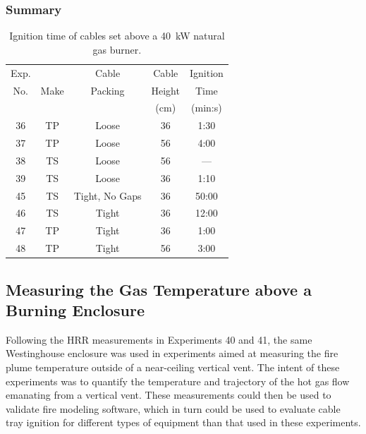 \clearpage

\subsubsection{Summary}

\begin{table}[ht]
\begin{center}
\caption[Summary of Cable Tray Ignition Experiments]{Ignition time of cables set above a 40~kW natural gas burner.}
\label{matrix2}
\begin{tabular}{|c|c|c|c|c|}
\hline
Exp.   &          & Cable             & Cable         & Ignition         \\
No.    & Make     & Packing           & Height        & Time             \\
       &          &                   & (cm)          & (min:s)          \\ \hline
36     & TP       & Loose             & 36            & 1:30             \\ \hline
37     & TP       & Loose             & 56            & 4:00             \\ \hline
38     & TS       & Loose             & 56            & ---              \\ \hline
39     & TS       & Loose             & 36            & 1:10             \\ \hline
45     & TS       & Tight, No Gaps    & 36            & 50:00            \\ \hline
46     & TS       & Tight             & 36            & 12:00            \\ \hline
47     & TP       & Tight             & 36            & 1:00             \\ \hline
48     & TP       & Tight             & 56            & 3:00             \\ \hline

\end{tabular}
\end{center}
\end{table}



\clearpage

\subsection{Measuring the Gas Temperature above a Burning Enclosure}

Following the HRR measurements in Experiments 40 and 41, the same Westinghouse enclosure was used in experiments aimed at measuring the fire plume temperature outside of a near-ceiling vertical vent. The intent of these experiments was to quantify the temperature and trajectory of the hot gas flow emanating from a vertical vent. These measurements could then be used to validate fire modeling software, which in turn could be used to evaluate cable tray ignition for different types of equipment than that used in these experiments.

